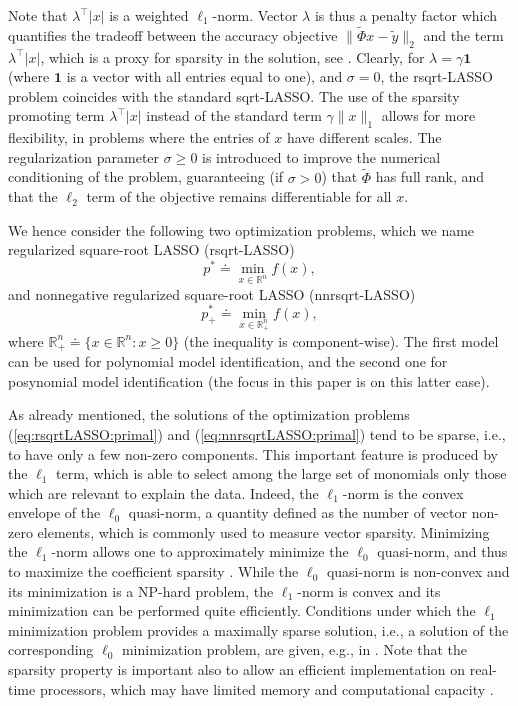 \documentclass[11pt]{article}
\newcommand{\one}{{\mathbf{1}}}
\begin{document}
Note that $\lambda^{\top}\left|x\right|$ is  a weighted
$\ell_{1}$-norm. Vector $\lambda$ is thus a penalty factor which
quantifies the tradeoff between the  accuracy objective
$\|\tilde{\Phi}x-\tilde{y}\|_{2}$ and the term $\lambda^{\top}\left|x\right|$,
which is a proxy for sparsity in the solution, see \cite{Fuchs05,Tropp06,Donoho06_2,Candes06_2}.
Clearly, for $\lambda=\gamma\one$ (where $\one$
is a vector with all entries equal to one), and $\sigma=0$, the rsqrt-LASSO
problem coincides with the standard sqrt-LASSO. 
The use of the sparsity
promoting term $\lambda^{\top}\left|x\right|$ instead of the standard
term $\gamma\|x\|_{1}$  allows for more flexibility, in problems
where the entries of $x$ have different scales. 
The regularization
parameter $\sigma\geq 0$  is introduced to improve the numerical conditioning of the problem, guaranteeing
(if $\sigma >0$) that $\tilde{\Phi}$ has full rank, and that the $\ell_2$ term of the objective remains differentiable for all $x$.

We hence consider the following two optimization problems, which
we name regularized square-root LASSO (rsqrt-LASSO)
\begin{equation}
p^{*}\doteq\min_{x\in\mathbb{R}^{n}}f(x),
\label{eq:rsqrtLASSO:primal}
\end{equation}
and nonnegative regularized square-root LASSO (nnrsqrt-LASSO)
\begin{equation}
p_{+}^{*}\doteq\min_{x\in\mathbb{R}_{+}^{n}}f(x),\label{eq:nnrsqrtLASSO:primal}
\end{equation}
where $\mathbb{R}_{+}^{n}\doteq\{x\in\mathbb{R}^{n}:x\geq0\}$ (the
inequality is component-wise). The first model can be used for polynomial model identification, and the second one for posynomial model identification (the focus in this paper is on this latter case).

As already mentioned, the solutions of the optimization problems (\ref{eq:rsqrtLASSO:primal})
and (\ref{eq:nnrsqrtLASSO:primal}) tend to be sparse, i.e., to have only a few non-zero components. This important feature is produced
by the $\ell_{1}$ term, which is able to select among the large set
of monomials only those which are relevant to explain the data.
Indeed, the $\ell_{1}$-norm is the convex envelope of the $\ell_{0}$
quasi-norm, a quantity defined as the number of vector non-zero elements,
which is commonly used to measure vector sparsity. 
Minimizing
the $\ell_{1}$-norm allows one to approximately minimize the $\ell_{0}$ quasi-norm,
and thus to maximize the coefficient sparsity \cite{Fuchs05,Tropp06,Donoho06_2,Candes06_2}.
While the $\ell_{0}$ quasi-norm is non-convex and its minimization
is a NP-hard problem, the $\ell_{1}$-norm is convex and its minimization
can be performed quite efficiently. Conditions under which the $\ell_{1}$
minimization problem provides a maximally sparse solution, i.e., a
solution of the corresponding $\ell_{0}$ minimization problem, are
given, e.g., in \cite{NoTAC12}. Note that the sparsity property is
important also to allow an efficient implementation on real-time processors,
which may have limited memory and computational capacity \cite{NoFaMiAUT13}.
\end{document}
